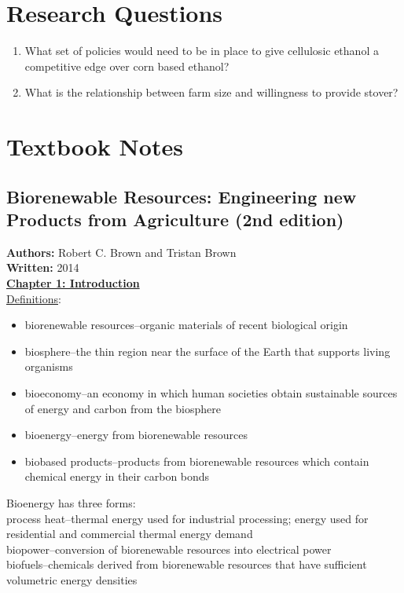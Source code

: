 \documentclass{article}\usepackage[]{graphicx}\usepackage[]{color}
\begin{document}
\lhead{\today}

\section{Research Questions}
\begin{enumerate}
\item What set of policies would need to be in place to give cellulosic ethanol a competitive edge over corn based ethanol?
\item What is the relationship between farm size and willingness to provide stover?
\end{enumerate}

\section{Textbook Notes}
\subsection{Biorenewable Resources: Engineering new Products from Agriculture (2nd edition)}
\textbf{Authors:} Robert C. Brown and Tristan Brown \\
\textbf{Written:} 2014 \\

\textbf{\underline{Chapter 1: Introduction}} \\

\underline{Definitions}: \\
\begin{itemize}
\item biorenewable resources--organic materials of recent biological origin
\item biosphere--the thin region near the surface of the Earth that supports living organisms
\item bioeconomy--an economy in which human societies obtain sustainable sources of energy and carbon from the biosphere
\item bioenergy--energy from biorenewable resources
\item biobased products--products from biorenewable resources which contain chemical energy in their carbon bonds
\end{itemize}

Bioenergy has three forms: \\
process heat--thermal energy used for industrial processing; energy used for residential and commercial thermal energy demand \\
biopower--conversion of biorenewable resources into electrical power \\
biofuels--chemicals derived from biorenewable resources that have sufficient volumetric energy densities \\
\end{document}
